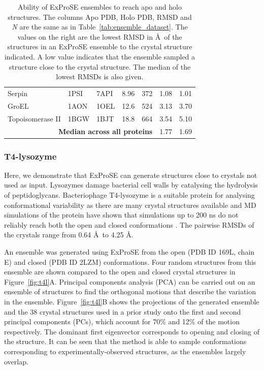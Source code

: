 \begin{table}
\begin{small}
\begin{tabular}{rrrrrll}
\multicolumn{1}{l}{Serpin}                    & \multicolumn{1}{l}{1PSI} & \multicolumn{1}{l}{7API} & \multicolumn{1}{l}{8.96} & \multicolumn{1}{l}{372} & 1.08  & 1.01 \\
\multicolumn{1}{l}{GroEL}                     & \multicolumn{1}{l}{1AON} & \multicolumn{1}{l}{1OEL} & \multicolumn{1}{l}{12.6} & \multicolumn{1}{l}{524} & 3.13  & 3.70 \\
\multicolumn{1}{l}{Topoisomerase II}          & \multicolumn{1}{l}{1BGW} & \multicolumn{1}{l}{1BJT} & \multicolumn{1}{l}{18.8} & \multicolumn{1}{l}{664} & 3.54  & 5.10 \\
\hline
\multicolumn{5}{r}{\textbf{Median across all proteins}} & 1.77  & 1.69 \\
\hline
\end{tabular}
\end{small}


\caption{Ability of ExProSE ensembles to reach apo and holo structures.
The columns Apo PDB, Holo PDB, RMSD and \textit{N} are the same as in Table~\ref{tab:ensemble_dataset}.
The values on the right are the lowest RMSD in \AA\ of the structures in an ExProSE ensemble to the crystal structure indicated.
A low value indicates that the ensemble sampled a structure close to the crystal structure.
The median of the lowest RMSDs is also given.}

\label{tab:ensemble_dataset_ex}
\end{table}


\subsubsection{T4-lysozyme}

Here, we demonstrate that ExProSE can generate structures close to crystals not used as input.
Lysozymes damage bacterial cell walls by catalysing the hydrolysis of peptidoglycans.
Bacteriophage T4-lysozyme is a suitable protein for analysing conformational variability as there are many crystal structures available and MD simulations of the protein have shown that simulations up to 200 ns do not reliably reach both the open and closed conformations \cite{Seeliger2007}.
The pairwise RMSDs of the crystals range from 0.64 \AA\ to 4.25 \AA.

An ensemble was generated using ExProSE from the open (PDB ID 169L, chain E) and closed (PDB ID 2LZM) conformations.
Four random structures from this ensemble are shown compared to the open and closed crystal structures in Figure~\ref{fig:t4l}A.
Principal components analysis (PCA) can be carried out on an ensemble of structures to find the orthogonal motions that describe the variation in the ensemble.
Figure~\ref{fig:t4l}B shows the projections of the generated ensemble and the 38 crystal structures used in a prior study \cite{DeGroot1998} onto the first and second principal components (PCs), which account for 70\% and 12\% of the motion respectively.
The dominant first eigenvector corresponds to opening and closing of the structure.
It can be seen that the method is able to sample conformations corresponding to experimentally-observed structures, as the ensembles largely overlap.

